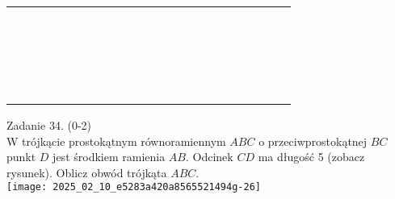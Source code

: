 \documentclass[10pt]{article}
\begin{document}
\begin{center}
\begin{tabular}{|c|c|c|c|c|c|c|c|c|c|c|c|c|c|c|c|c|c|c|c|c|c|}
\hline
 &  &  &  &  &  &  &  &  &  &  &  &  &  &  &  &  &  &  &  &  &  \\
\hline
 &  &  &  &  &  &  &  &  &  &  &  &  &  &  &  &  &  &  &  &  &  \\
\hline
 &  &  &  &  &  &  &  &  &  &  &  &  &  &  &  &  &  &  &  &  &  \\
\hline
 &  &  &  &  &  &  &  &  &  &  &  &  &  &  &  &  &  &  &  &  &  \\
\hline
 &  &  &  &  &  &  &  &  &  &  &  &  &  &  &  &  &  &  &  &  &  \\
\hline
 &  &  &  &  &  &  &  &  &  &  &  &  &  &  &  &  &  &  &  &  &  \\
\hline
 &  &  &  &  &  &  &  &  &  &  &  &  &  &  &  &  &  &  &  &  &  \\
\hline
 &  &  &  &  &  &  &  &  &  &  &  &  &  &  &  &  &  &  &  &  &  \\
\hline
 &  &  &  &  &  &  &  &  &  &  &  &  &  &  &  &  &  &  &  &  &  \\
\hline
 &  &  &  &  &  &  &  &  &  &  &  &  &  &  &  &  &  &  &  &  &  \\
\hline
 &  &  &  &  &  &  &  &  &  &  &  &  &  &  &  &  &  &  &  &  &  \\
\hline
 &  &  &  &  &  &  &  &  &  &  &  &  &  &  &  &  &  &  &  &  &  \\
\hline
 &  &  &  &  &  &  &  &  &  &  &  &  &  &  &  &  &  &  &  &  &  \\
\hline
 &  &  &  &  &  &  &  &  &  &  &  &  &  &  &  &  &  &  &  &  &  \\
\hline
 &  &  &  &  &  &  &  &  &  &  &  &  &  &  &  &  &  &  &  &  &  \\
\hline
 &  &  &  &  &  &  &  &  &  &  &  &  &  &  &  &  &  &  &  &  &  \\
\hline
 &  &  &  &  &  &  &  &  &  &  &  &  &  &  &  &  &  &  &  &  &  \\
\hline
 &  &  &  &  &  &  &  &  &  &  &  &  &  &  &  &  &  &  &  &  &  \\
\hline
 &  &  &  &  &  &  &  &  &  &  &  &  &  &  &  &  &  &  &  &  &  \\
\hline
 &  &  &  &  &  &  &  &  &  &  &  &  &  &  &  &  &  &  &  &  &  \\
\hline
 &  &  &  &  &  &  &  &  &  &  &  &  &  &  &  &  &  &  &  &  &  \\
\hline
\end{tabular}
\end{center}

Zadanie 34. (0-2)\\
W trójkącie prostokątnym równoramiennym \(A B C\) o przeciwprostokątnej \(B C\) punkt \(D\) jest środkiem ramienia \(A B\). Odcinek \(C D\) ma długość 5 (zobacz rysunek). Oblicz obwód trójkąta \(A B C\).\\
\texttt{[image: 2025\_02\_10\_e5283a420a8565521494g-26]}
\end{document}

